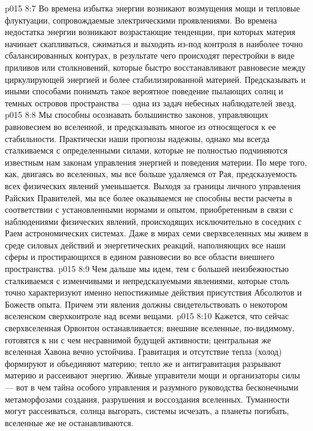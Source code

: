 \vs p015 8:7 Во времена избытка энергии возникают возмущения мощи и тепловые флуктуации, сопровождаемые электрическими проявлениями. Во времена недостатка энергии возникают возрастающие тенденции, при которых материя начинает скапливаться, сжиматься и выходить из\hyp{}под контроля в наиболее точно сбалансированных контурах, в результате чего происходят перестройки в виде приливов или столкновений, которые быстро восстанавливают равновесие между циркулирующей энергией и более стабилизированной материей. Предсказывать и иными способами понимать такое вероятное поведение пылающих солнц и темных островов пространства --- одна из задач небесных наблюдателей звезд.
\vs p015 8:8 Мы способны осознавать большинство законов, управляющих равновесием во вселенной, и предсказывать многое из относящегося к ее стабильности. Практически наши прогнозы надежны, однако мы всегда сталкиваемся с определенными силами, которые не полностью подчиняются известным нам законам управления энергией и поведения материи. По мере того, как, двигаясь во вселенных, мы все больше удаляемся от Рая, предсказуемость всех физических явлений уменьшается. Выходя за границы личного управления Райских Правителей, мы все более оказываемся не способны вести расчеты в соответствии с установленными нормами и опытом, приобретенным в связи с наблюдениями физических явлений, происходящих исключительно в соседних с Раем астрономических системах. Даже в мирах семи сверхвселенных мы живем в среде силовых действий и энергетических реакций, наполняющих все наши сферы и простирающихся в едином равновесии во все области внешнего пространства.
\vs p015 8:9 Чем дальше мы идем, тем с большей неизбежностью сталкиваемся с изменчивыми и непредсказуемыми явлениями, которые столь точно характеризуют именно непостижимые действия присутствия Абсолютов и Божеств опыта. Причем эти явления должны свидетельствовать о некотором вселенском сверхконтроле над всеми вещами.
\vs p015 8:10 Кажется, что сейчас сверхвселенная Орвонтон останавливается; внешние вселенные, по\hyp{}видимому, готовятся к ни с чем несравнимой будущей активности; центральная же вселенная Хавона вечно устойчива. Гравитация и отсутствие тепла (холод) формируют и объединяют материю; тепло же и антигравитация разрывают материю и рассеивают энергию. Живые управители мощи и организаторы силы --- вот в чем тайна особого управления и разумного руководства бесконечными метаморфозами создания, разрушения и воссоздания вселенных. Туманности могут рассеиваться, солнца выгорать, системы исчезать, а планеты погибать, вселенные же не останавливаются.
